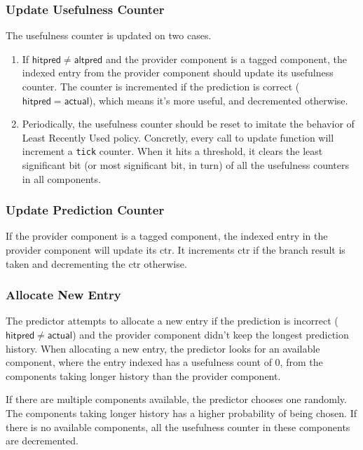 \documentclass[screen,nonacm]{acmart}
\begin{document}
\subsubsection{Update Usefulness Counter}
The usefulness counter is updated on two cases.
\begin{enumerate}
  \item If $\mathsf{hitpred} \ne \mathsf{altpred}$ and the provider component is a tagged component,
        the indexed entry from the provider component should update its usefulness counter.
        The counter is incremented if the prediction is correct ($ \mathsf{hitpred} = \mathsf{actual} $),
        which means it's more useful, and decremented otherwise.
  \item Periodically, the usefulness counter should be reset to imitate the
        behavior of Least Recently Used policy.
        Concretly, every call to update function will increment a \texttt{tick} counter.
        When it hits a threshold, it clears the least significant bit (or most significant bit, in turn) of all the usefulness counters in all components.
\end{enumerate}

\subsubsection{Update Prediction Counter}

If the provider component is a tagged component,
the indexed entry in the provider component will update its \textsf{ctr}.
It increments \textsf{ctr} if the branch result is \textsf{taken}
and decrementing the \textsf{ctr} otherwise.

\subsubsection{Allocate New Entry}

The predictor attempts to allocate a new entry
if the prediction is incorrect ($ \mathsf{hitpred} \ne \mathsf{actual} $)
and the provider component didn't keep the longest prediction history.
When allocating a new entry, the predictor looks for an available component,
where the entry indexed has a usefulness count of 0,
from the components taking longer history than the provider component.

If there are multiple components available, the predictor chooses one randomly.
The components taking longer history has a higher probability of being chosen.
If there is no available components,
all the usefulness counter in these components are decremented.
\end{document}
